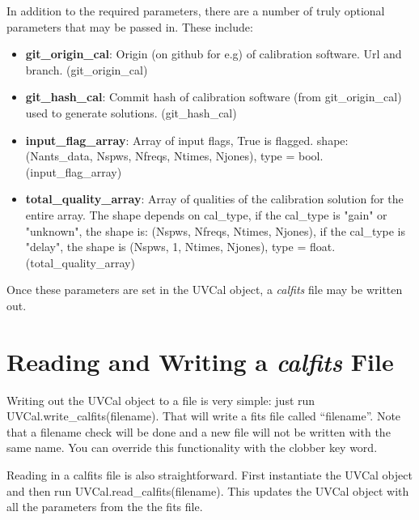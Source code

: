 \documentclass[11pt, oneside, english]{article}   	%
\begin{document}
In addition to the required parameters, there are a number of truly optional
parameters that may be passed in. These include:

\begin{itemize}
\item{\textbf{git\_origin\_cal}: Origin (on github for e.g) of calibration
    software. Url and branch. (git\_origin\_cal)}
\item{\textbf{git\_hash\_cal}: Commit hash of calibration software (from
    git\_origin\_cal) used to generate solutions. (git\_hash\_cal)}
\item{\textbf{input\_flag\_array}: Array of input flags, True is flagged. shape:
    (Nants\_data, Nspws, Nfreqs, Ntimes, Njones), type = bool. (input\_flag\_array)}
\item{\textbf{total\_quality\_array}: Array of qualities of the calibration
    solution for the entire array. The shape depends on cal\_type, if the cal\_type is
    "gain" or "unknown", the shape is: (Nspws, Nfreqs, Ntimes, Njones), if the 
    cal\_type is "delay", the shape is (Nspws, 1, Ntimes, Njones), type = float. (total\_quality\_array)}
\end{itemize}

Once these parameters are set in the UVCal object, a \textit{calfits} file may
be written out.

\section{Reading and Writing a \textit{calfits} File}
Writing out the UVCal object to a file is very simple: just run
UVCal.write\_calfits(filename). That will write a fits file called
``filename''. Note that a filename check will be done and a new file will not be
written with the same name. You can override this functionality with the clobber
key word.

Reading in a calfits file is also straightforward. First instantiate the UVCal object and
then run UVCal.read\_calfits(filename). This updates the UVCal object with all
the parameters from the the fits file.
\end{document}

